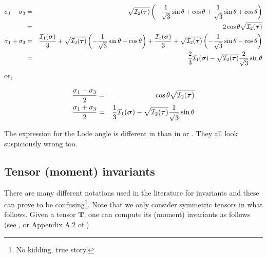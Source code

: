\begin{eqnarray}
\sigma_1 -\sigma_3
&=&  \sqrt{{\cal I}_2({\bm \tau})} \left( 
-\frac{1}{\sqrt{3}}\sin \theta  + \cos \theta 
+\frac{1}{\sqrt{3}}\sin \theta  + \cos \theta \right) \nonumber\\
&=& 2 \cos \theta \sqrt{{\cal I}_2({\bm \tau})} \\ 
\sigma_1 + \sigma_3 
&=&   
\frac{{\cal I}_1({\bm \sigma})}{3} + \sqrt{{\cal I}_2({\bm \tau})} \left(-\frac{1}{\sqrt{3}}\sin \theta  + \cos \theta \right)   
+\frac{{\cal I}_1({\bm \sigma})}{3} + \sqrt{{\cal I}_2({\bm \tau})} \left(-\frac{1}{\sqrt{3}}\sin \theta  - \cos \theta \right)   
 \nonumber\\
&=& 
\frac{2}{3} {\cal I}_1({\bm \sigma}) -\sqrt{ {\cal I}_2({\bm \tau})} \frac{2}{\sqrt{3}}\sin \theta 
\end{eqnarray}
or, 
\begin{mdframed}[backgroundcolor=blue!5]
\begin{eqnarray}
\frac{\sigma_1 -\sigma_3}{2} &=&  \cos \theta \sqrt{{\cal I}_2({\bm \tau})}  \label{eq:sig13a} \\
\frac{\sigma_1 + \sigma_3}{2} &=& \frac{1}{3} {\cal I}_1({\bm \sigma}) -\sqrt{{\cal I}_2({\bm \tau})} \frac{1}{\sqrt{3}}\sin \theta \label{eq:sig13b}
\end{eqnarray}
\end{mdframed}



\begin{remark}
The expression for the Lode angle is different in \cite[p101]{book_zitf} than in \cite{zico74} or \cite[p62]{zita2}. They all look suspiciously wrong too.
\end{remark}


\subsection{Tensor (moment) invariants}\label{sec:invariants}


There are many different notations used in the literature for invariants 
and these can prove to be 
confusing\footnote{No kidding, true story.}. Note that we only consider symmetric tensors in what follows.
Given a tensor $\bm{T}$,  one can compute its (moment) invariants as follows 
(see \cite[p.339]{reddybook2}, or Appendix A.2 of \cite{zita2})

